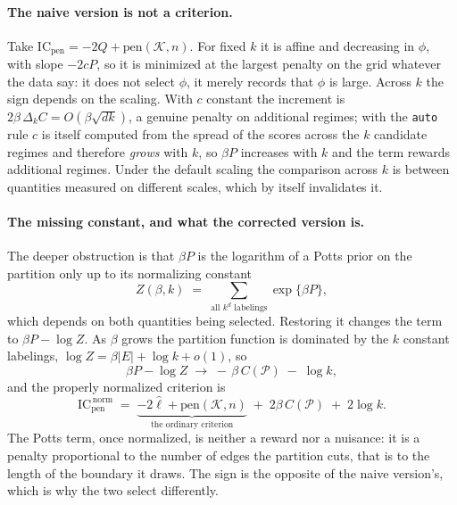 \documentclass[11pt]{article}
\begin{document}
\paragraph{The naive version is not a criterion.} Take $\mathrm{IC}_{\mathrm{pen}} = -2Q + \mathrm{pen}(\mathcal{K}, n)$. For fixed $k$ it is affine and decreasing in $\phi$, with slope $-2cP$, so it is minimized at the largest penalty on the grid whatever the data say: it does not select $\phi$, it merely records that $\phi$ is large. Across $k$ the sign depends on the scaling. With $c$ constant the increment is $2\beta\,\Delta_k C = O(\beta\sqrt{dk})$, a genuine penalty on additional regimes; with the \texttt{auto} rule $c$ is itself computed from the spread of the scores across the $k$ candidate regimes and therefore \emph{grows} with $k$, so $\beta P$ increases with $k$ and the term rewards additional regimes. Under the default scaling the comparison across $k$ is between quantities measured on different scales, which by itself invalidates it.

\paragraph{The missing constant, and what the corrected version is.} The deeper obstruction is that $\beta P$ is the logarithm of a Potts prior on the partition only up to its normalizing constant
\[
  Z(\beta,k) \;=\; \sum_{\text{all } k^d \text{ labelings}} \exp\{\beta P\},
\]
which depends on both quantities being selected. Restoring it changes the term to $\beta P - \log Z$. As $\beta$ grows the partition function is dominated by the $k$ constant labelings, $\log Z = \beta |E| + \log k + o(1)$, so
\begin{equation}\label{eq:sm:normalized}
  \beta P - \log Z \;\longrightarrow\; -\,\beta\, C(\mathcal{P}) \;-\; \log k ,
\end{equation}
and the properly normalized criterion is
\begin{equation}\label{eq:sm:ICnorm}
  \mathrm{IC}_{\mathrm{pen}}^{\,\mathrm{norm}}
  \;=\; \underbrace{-2\hat\ell + \mathrm{pen}(\mathcal{K}, n)}_{\text{the ordinary criterion}}
  \;+\; 2\beta\, C(\mathcal{P}) \;+\; 2\log k .
\end{equation}
The Potts term, once normalized, is neither a reward nor a nuisance: it is a penalty proportional to the number of edges the partition cuts, that is to the length of the boundary it draws. The sign is the opposite of the naive version's, which is why the two select differently.
\end{document}

